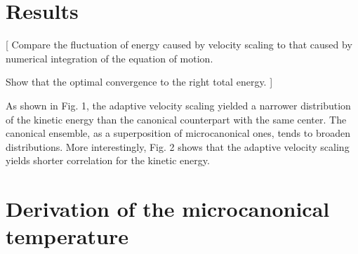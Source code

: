 \documentclass[reprint]{revtex4-1}
\begin{document}
\section{Results}


[
Compare the fluctuation of energy caused by velocity scaling to
that caused by numerical integration of the equation of motion.


Show that the optimal convergence to the right total energy.
]

As shown in Fig. 1,
the adaptive velocity scaling yielded a narrower distribution
of the kinetic energy than the canonical counterpart
with the same center.
%
The canonical ensemble, as a superposition
of microcanonical ones,
tends to broaden distributions.
%
More interestingly,
Fig. 2 shows that the adaptive velocity scaling
yields shorter correlation for the kinetic energy.

\appendix


\section{Derivation of the microcanonical temperature}
\end{document}
